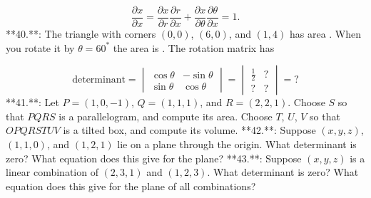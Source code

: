 \[\frac{\partial x}{\partial x}=\frac{\partial x}{\partial r}\frac{\partial r} {\partial x}+\frac{\partial x}{\partial\theta}\frac{\partial\theta}{\partial x }=1.\]
**40.**: The triangle with corners \((0,0)\), \((6,0)\), and \((1,4)\) has area . When you rotate it by \(\theta=60^{\ast}\) the area is . The rotation matrix has

\[\text{determinant}=\begin{vmatrix}\cos\theta&-\sin\theta\\ \sin\theta&\cos\theta\end{vmatrix}=\begin{vmatrix}\frac{1}{2}&?\\ ?&?\end{vmatrix}=?\]
**41.**: Let \(P=(1,0,-1)\), \(Q=(1,1,1)\), and \(R=(2,2,1)\). Choose \(S\) so that \(PQRS\) is a parallelogram, and compute its area. Choose \(T\), \(U\), \(V\) so that \(OPQRSTUV\) is a tilted box, and compute its volume.
**42.**: Suppose \((x,y,z)\), \((1,1,0)\), and \((1,2,1)\) lie on a plane through the origin. What determinant is zero? What equation does this give for the plane?
**43.**: Suppose \((x,y,z)\) is a linear combination of \((2,3,1)\) and \((1,2,3)\). What determinant is zero? What equation does this give for the plane of all combinations?